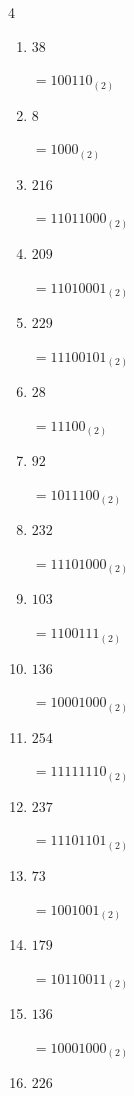 \begin{multicols}{4}
\begin{enumerate}
        $=11111_{(2)}$

  \item $38$

        $=100110_{(2)}$

  \item $8$

        $=1000_{(2)}$

  \item $216$

        $=11011000_{(2)}$

  \item $209$

        $=11010001_{(2)}$

  \item $229$

        $=11100101_{(2)}$

  \item $28$

        $=11100_{(2)}$

  \item $92$

        $=1011100_{(2)}$

  \item $232$

        $=11101000_{(2)}$

  \item $103$

        $=1100111_{(2)}$

  \item $136$

        $=10001000_{(2)}$

  \item $254$

        $=11111110_{(2)}$

  \item $237$

        $=11101101_{(2)}$

  \item $73$

        $=1001001_{(2)}$

  \item $179$

        $=10110011_{(2)}$

\columnbreak %

  \item $136$

        $=10001000_{(2)}$

  \item $226$


\end{enumerate}
\end{multicols}
